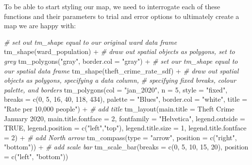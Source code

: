 \documentclass[
]{book}
\newenvironment{Shaded}{\begin{snugshade}}{\end{snugshade}}
\newcommand{\AttributeTok}[1]{\textcolor[rgb]{0.77,0.63,0.00}{#1}}
\newcommand{\CommentTok}[1]{\textcolor[rgb]{0.56,0.35,0.01}{\textit{#1}}}
\newcommand{\ConstantTok}[1]{\textcolor[rgb]{0.00,0.00,0.00}{#1}}
\newcommand{\DecValTok}[1]{\textcolor[rgb]{0.00,0.00,0.81}{#1}}
\newcommand{\FunctionTok}[1]{\textcolor[rgb]{0.00,0.00,0.00}{#1}}
\newcommand{\NormalTok}[1]{#1}
\newcommand{\SpecialCharTok}[1]{\textcolor[rgb]{0.00,0.00,0.00}{#1}}
\newcommand{\StringTok}[1]{\textcolor[rgb]{0.31,0.60,0.02}{#1}}
\begin{document}
To be able to start styling our map, we need to interrogate each of these functions and their parameters to trial and error options to ultimately create a map we are happy with:

\begin{Shaded}
\begin{Highlighting}[]
\CommentTok{\# set out tm\_shape equal to our original ward data frame}
\FunctionTok{tm\_shape}\NormalTok{(ward\_population) }\SpecialCharTok{+} 
  \CommentTok{\# draw out spatial objects as polygons, set to grey}
  \FunctionTok{tm\_polygons}\NormalTok{(}\StringTok{"gray"}\NormalTok{, }\AttributeTok{border.col =} \StringTok{"gray"}\NormalTok{) }\SpecialCharTok{+} 
\CommentTok{\# set our tm\_shape equal to our spatial data frame}
\FunctionTok{tm\_shape}\NormalTok{(theft\_crime\_rate\_sdf) }\SpecialCharTok{+} 
  \CommentTok{\# draw out spatial objects as polygons, specifying a data column, }
  \CommentTok{\# specifying fixed breaks, colour palette, and borders}
  \FunctionTok{tm\_polygons}\NormalTok{(}\AttributeTok{col =} \StringTok{"jan\_2020"}\NormalTok{, }\AttributeTok{n =} \DecValTok{5}\NormalTok{, }\AttributeTok{style =} \StringTok{"fixed"}\NormalTok{, }
              \AttributeTok{breaks =} \FunctionTok{c}\NormalTok{(}\DecValTok{0}\NormalTok{, }\DecValTok{5}\NormalTok{, }\DecValTok{16}\NormalTok{, }\DecValTok{40}\NormalTok{, }\DecValTok{118}\NormalTok{, }\DecValTok{434}\NormalTok{), }
              \AttributeTok{palette =} \StringTok{"Blues"}\NormalTok{, }\AttributeTok{border.col =} \StringTok{"white"}\NormalTok{, }
              \AttributeTok{title =} \StringTok{"Rate per 10,000 people"}\NormalTok{) }\SpecialCharTok{+} 
  \CommentTok{\# add title}
  \FunctionTok{tm\_layout}\NormalTok{(}\AttributeTok{main.title =} \StringTok{\textquotesingle{}Theft Crime January 2020\textquotesingle{}}\NormalTok{, }
            \AttributeTok{main.title.fontface =} \DecValTok{2}\NormalTok{, }
            \AttributeTok{fontfamily =} \StringTok{"Helvetica"}\NormalTok{, }
            \AttributeTok{legend.outside =} \ConstantTok{TRUE}\NormalTok{, }
            \AttributeTok{legend.position =} \FunctionTok{c}\NormalTok{(}\StringTok{"left"}\NormalTok{,}\StringTok{"top"}\NormalTok{), }
            \AttributeTok{legend.title.size =} \DecValTok{1}\NormalTok{, }
            \AttributeTok{legend.title.fontface =} \DecValTok{2}\NormalTok{) }\SpecialCharTok{+}
  \CommentTok{\# add North arrow}
  \FunctionTok{tm\_compass}\NormalTok{(}\AttributeTok{type =} \StringTok{"arrow"}\NormalTok{, }
             \AttributeTok{position =} \FunctionTok{c}\NormalTok{(}\StringTok{"right"}\NormalTok{, }\StringTok{"bottom"}\NormalTok{)) }\SpecialCharTok{+} 
  \CommentTok{\# add scale bar}
  \FunctionTok{tm\_scale\_bar}\NormalTok{(}\AttributeTok{breaks =} \FunctionTok{c}\NormalTok{(}\DecValTok{0}\NormalTok{, }\DecValTok{5}\NormalTok{, }\DecValTok{10}\NormalTok{, }\DecValTok{15}\NormalTok{, }\DecValTok{20}\NormalTok{), }
               \AttributeTok{position =} \FunctionTok{c}\NormalTok{(}\StringTok{"left"}\NormalTok{, }\StringTok{"bottom"}\NormalTok{))}
\end{Highlighting}
\end{Shaded}
\end{document}
